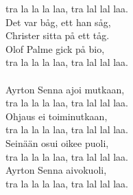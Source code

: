             tra la la la laa, tra lal lal laa. \\
            Det var båg, ett han såg, \\
            Christer sitta på ett tåg. \\
            Olof Palme gick på bio, \\
            tra la la la laa, tra lal lal laa. \\
\hspace{10mm} \\
            Ayrton Senna ajoi mutkaan, \\
            tra la la la laa, tra lal lal laa. \\
            Ohjaus ei toiminutkaan, \\
            tra la la la laa, tra lal lal laa. \\
            Seinään osui oikee puoli, \\
            tra la la la laa, tra lal lal laa. \\
            Ayrton Senna aivokuoli, \\
            tra la la la laa, tra lal lal laa. \\
\hspace{10mm} \\
            \begin{comment} Lisäsäkeistö: \\
\hspace{10mm} \\
            Ayrton Senna törmäs seinään, \\
            tra la la la laa, tra lal lal laa. \\
            Betoniin ei niinkään heinään, \\
            tra la la la laa, tra lal lal laa. \\
            Liian tarkkaan mutkan nuoli, \\
            tra la la la laa, tra lal lal laa. \\
            Kohta meidän Ayrton kuoli, \\
            tra la la la laa, tra lal lal laa. \\
\end{comment}